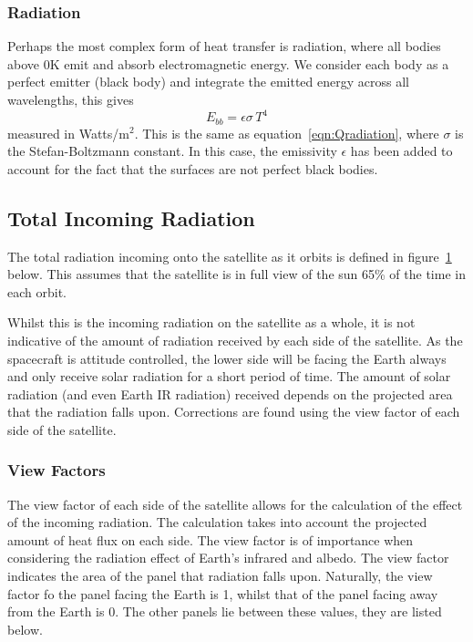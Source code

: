 \subsubsection{Radiation}
Perhaps the most complex form of heat transfer is radiation, where all bodies above 0K emit and absorb electromagnetic energy. We consider each body as a perfect emitter (black body) and integrate the emitted energy across all wavelengths, this gives
\begin{equation}
E_{bb} = \epsilon\sigma\,T^4
\end{equation}
measured in Watts/m$^2$. This is the same as equation~\ref{eqn:Qradiation}, where $\sigma$ is the Stefan-Boltzmann constant. In this case, the emissivity $\epsilon$ has been added to account for the fact that the surfaces are not perfect black bodies.

\subsection{Total Incoming Radiation}
The total radiation incoming onto the satellite as it orbits is defined in figure~\ref{plot:incomingradiation} below. This assumes that the satellite is in full view of the sun 65\% of the time in each orbit.
\begin{figure}[H]
    \label{plot:incomingradiation}
\end{figure}
\noindent
Whilst this is the incoming radiation on the satellite as a whole, it is not indicative of the amount of radiation received by each side of the satellite. As the spacecraft is attitude controlled, the lower side will be facing the Earth always and only receive solar radiation for a short period of time. The amount of solar radiation (and even Earth IR radiation) received depends on the projected area that the radiation falls upon. Corrections are found using the view factor of each side of the satellite.

\subsubsection{View Factors}\label{sec:viewfactors}
The view factor of each side of the satellite allows for the calculation of the effect of the incoming radiation. The calculation takes into account the projected amount of heat flux on each side. The view factor is of importance when considering the radiation effect of Earth's infrared and albedo. The view factor indicates the area of the panel that  radiation falls upon. Naturally, the view factor fo the panel facing the Earth is 1, whilst that of the panel facing away from the Earth is 0. The other panels lie between these values, they are listed below.

